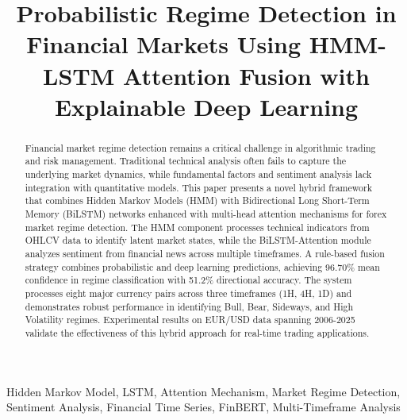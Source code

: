 \documentclass[conference]{IEEEtran}
\begin{document}
\title{Probabilistic Regime Detection in Financial Markets Using HMM-LSTM Attention Fusion with Explainable Deep Learning}

\author{
}

\maketitle

\begin{abstract}
Financial market regime detection remains a critical challenge in algorithmic trading and risk management. Traditional technical analysis often fails to capture the underlying market dynamics, while fundamental factors and sentiment analysis lack integration with quantitative models. This paper presents a novel hybrid framework that combines Hidden Markov Models (HMM) with Bidirectional Long Short-Term Memory (BiLSTM) networks enhanced with multi-head attention mechanisms for forex market regime detection. The HMM component processes technical indicators from OHLCV data to identify latent market states, while the BiLSTM-Attention module analyzes sentiment from financial news across multiple timeframes. A rule-based fusion strategy combines probabilistic and deep learning predictions, achieving 96.70\% mean confidence in regime classification with 51.2\% directional accuracy. The system processes eight major currency pairs across three timeframes (1H, 4H, 1D) and demonstrates robust performance in identifying Bull, Bear, Sideways, and High Volatility regimes. Experimental results on EUR/USD data spanning 2006-2025 validate the effectiveness of this hybrid approach for real-time trading applications.
\end{abstract}

\begin{IEEEkeywords}
Hidden Markov Model, LSTM, Attention Mechanism, Market Regime Detection, Sentiment Analysis, Financial Time Series, FinBERT, Multi-Timeframe Analysis
\end{IEEEkeywords}
\end{document}
